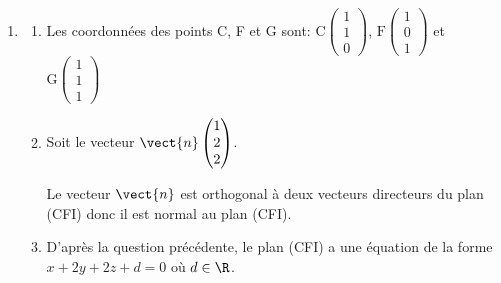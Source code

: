 \begin{enumerate}
\item 
	\begin{enumerate}
		\item Les coordonnées des points C, F et G sont:
$\text{C}\begin{pmatrix}1\\1\\0\end{pmatrix}$, $\text{F}\begin{pmatrix}1\\0\\1\end{pmatrix}$ et $\text{G}\begin{pmatrix}1\\1\\1\end{pmatrix}$
		
		\item Soit le vecteur $\vect{n}\begin{pmatrix}1\\2\\2\end{pmatrix}$.
		

Le vecteur $\vect{n}$ est orthogonal à deux vecteurs directeurs du plan (CFI) donc il est normal au plan (CFI).
	
		\item
D'après la question précédente, le plan (CFI) a une équation de la forme \\
$x+2y+2z+d=0$ où $d\in\R$.


\end{enumerate}
\end{enumerate}
